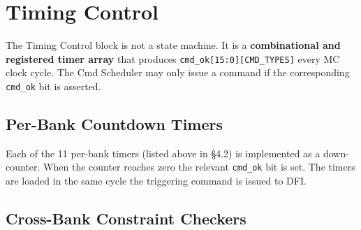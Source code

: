 \documentclass[11pt,a4paper]{article}
\newcommand{\sig}[1]{\textcolor{ddrteal}{\texttt{#1}}}
\begin{document}
\section{Timing Control}

The Timing Control block is not a state machine. It is a \textbf{combinational and
registered timer array} that produces \sig{cmd\_ok[15:0][CMD\_TYPES]} every MC clock
cycle. The Cmd Scheduler may only issue a command if the corresponding
\sig{cmd\_ok} bit is asserted.

\subsection{Per-Bank Countdown Timers}

Each of the 11 per-bank timers (listed above in \S4.2) is implemented as a
down-counter. When the counter reaches zero the relevant \sig{cmd\_ok} bit
is set. The timers are loaded in the same cycle the triggering command is
issued to DFI.

\subsection{Cross-Bank Constraint Checkers}
\end{document}
